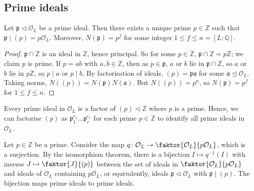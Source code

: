 \subsection{Prime ideals}
\begin{lemma}
    Let \( \mathfrak p \triangleleft \mathcal O_L \) be a prime ideal.
    Then there exists a unique prime \( p \in \mathbb Z \) such that \( \mathfrak p \mid (p) = p\mathcal O_L \).
    Moreover, \( N(\mathfrak p) = p^f \) for some integer \( 1 \leq f \leq n = [L:\mathbb Q] \).
\end{lemma}
\begin{proof}
    \( \mathfrak p \cap \mathbb Z \) is an ideal in \( \mathbb Z \), hence principal.
    So for some \( p \in \mathbb Z \), \( \mathfrak p \cap \mathbb Z = p \mathbb Z \); we claim \( p \) is prime.
    If \( p = ab \) with \( a, b \in \mathbb Z \), then as \( p \in \mathfrak p \), \( a \) or \( b \) lie in \( \mathfrak p \cap \mathbb Z \), so \( a \) or \( b \) lie in \( p \mathbb Z \), so \( p \mid a \) or \( p \mid b \).
    By factorisation of ideals, \( (p) = \mathfrak p \mathfrak a \) for some \( \mathfrak a \trianglelefteq \mathcal O_L \).
    Taking norms, \( N((p)) = N(\mathfrak p) N(\mathfrak a) \).
    But \( N((p)) = p^n \), so \( N(\mathfrak p) = p^f \) for \( 1 \leq f \leq n \).
\end{proof}
\begin{remark}
    Every prime ideal in \( \mathcal O_L \) is a factor of \( (p) \triangleleft \mathbb Z \) where \( p \) is a prime.
    Hence, we can factorise \( (p) \) as \( \mathfrak p_1^{e_1} \dots \mathfrak p_r^{e_r} \) for each prime \( p \in \mathbb Z \) to identify all prime ideals in \( \mathcal O_L \).
\end{remark}
Let \( p \in \mathbb Z \) be a prime.
Consider the map \( q \colon \mathcal O_L \to \faktor{\mathcal O_L}{p\mathcal O_L} \), which is a surjection.
By the isomorphism theorem, there is a bijection \( I \mapsto q^{-1}(I) \) with inverse \( J \mapsto \faktor{J}{(p)} \) between the set of ideals in \( \faktor{\mathcal O_L}{p\mathcal O_L} \) and ideals of \( \mathcal O_L \) containing \( p\mathcal O_L \), or equivalently, ideals \( \mathfrak p \triangleleft \mathcal O_L \) with \( \mathfrak p \mid (p) \).
The bijection maps prime ideals to prime ideals.

